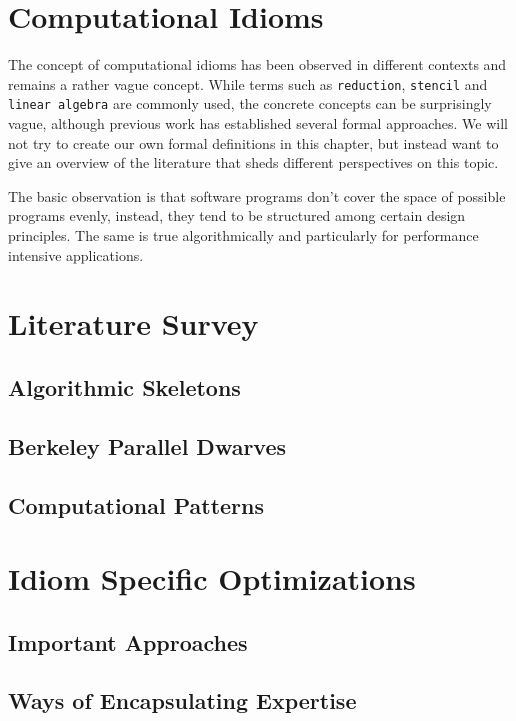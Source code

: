 \section{Computational Idioms}

    The concept of computational idioms has been observed in different contexts
    and remains a rather vague concept.
    While terms such as \texttt{reduction}, \texttt{stencil} and
    \texttt{linear algebra} are commonly used, the concrete concepts can be
    surprisingly vague, although previous work has established several formal
    approaches.
    We will not try to create our own formal definitions in this chapter, but
    instead want to give an overview of the literature that sheds different
    perspectives on this topic.

    The basic observation is that software programs don't cover the space of
    possible programs evenly, instead, they tend to be structured among certain
    design principles.
    The same is true algorithmically and particularly for performance intensive
    applications.

\section{Literature Survey}
\subsection{Algorithmic Skeletons}

\subsection{Berkeley Parallel Dwarves}
\subsection{Computational Patterns}

\section{Idiom Specific Optimizations}

\subsection{Important Approaches}
\subsection{Ways of Encapsulating Expertise}

